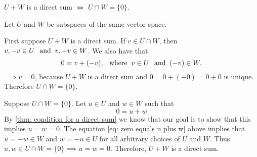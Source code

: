 \setcounter{thm}{45}
\begin{thm} 
  \label{thm: sum and intersection of two subspaces}
  $U+W$ is a direct sum $\iff$ $U \cap W = \{0\}$.
\end{thm}
\begin{prf} Let $U$ and $W$ be subspaces of the same vector space.
  \begin{description}
    \item{} First suppose $U+W$ is a direct sum. If $v \in U \cap W$, then $v, -v \in U \;\;\, \text{and}\;\; v, -v \in W$. We also have that
    \begin{equation}
      0 = v + (-v), \;\;\, \text{where}\;\; v\in U \;\;\, \text{and}\;\; (-v) \in W.
    \end{equation}
    $\implies v=0$, because $U+W$  is a direct sum and $0 = 0+(-0)=0+0$ is unique. Therefore $U \cap W = \{0\}$.

    \item{} Suppose $U\cap W = \{0\}$. Let  $u\in U$ and $w \in W$ such that
    \begin{equation}
      \label{eq: zero equals u plus w}
      0 = u+w
    \end{equation}
    By \ref{thm: condition for a direct sum} we know that our goal is to show that this implies $u=w=0$. The equation \eqref{eq: zero equals u plus w} above implies that $u=-w\in W$  and $w=-u \in U$ for all arbitrary choices of $U$ and $W$. Thus $u,w \in U\cap W = \{0\} \implies u=w=0.$ Therefore, $U+W$ is a direct sum.
  \end{description}
  \vspace{-\baselineskip}
\end{prf}
